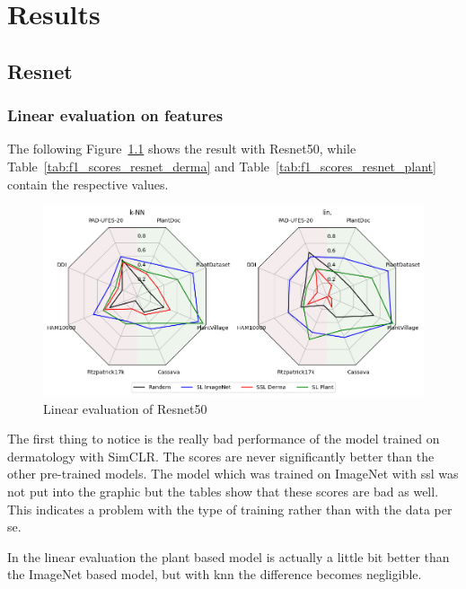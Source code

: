 \chapter{Results}

\section{Resnet}

\subsection{Linear evaluation on features}


The following Figure~\ref{fig:spider_resnet50} shows the result with Resnet50, while Table~\ref{tab:f1_scores_resnet_derma} and Table~\ref{tab:f1_scores_resnet_plant} contain the respective values.
\begin{figure}[H]
    \begin{center}
    \includegraphics[width=15cm]{../images/spider_resnet50.png}
    \caption{Linear evaluation of Resnet50}\label{fig:spider_resnet50}
    \end{center}
\end{figure}

The first thing to notice is the really bad performance of the model trained on dermatology with SimCLR. The scores are never significantly better than the other pre-trained models. The model which was trained on ImageNet with \gls{ssl} was not put into the graphic but the tables show that these scores are bad as well. 
This indicates a problem with the type of training rather than with the data per se.

In the linear evaluation the plant based model is actually a little bit better than the ImageNet based model, but with \gls{knn} the difference becomes negligible.

